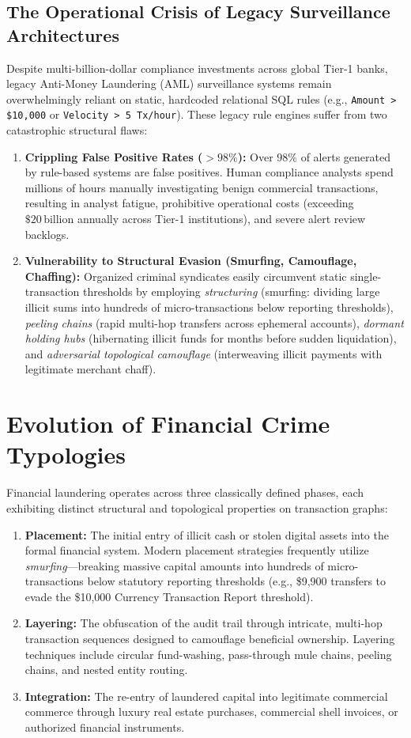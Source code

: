 \subsection{The Operational Crisis of Legacy Surveillance Architectures}
Despite multi-billion-dollar compliance investments across global Tier-1 banks, legacy Anti-Money Laundering (AML) surveillance systems remain overwhelmingly reliant on static, hardcoded relational SQL rules (e.g., \texttt{Amount > \$10,000} or \texttt{Velocity > 5 Tx/hour}). These legacy rule engines suffer from two catastrophic structural flaws:
\begin{enumerate}
    \item \textbf{Crippling False Positive Rates ($>98\%$):} Over $98\%$ of alerts generated by rule-based systems are false positives. Human compliance analysts spend millions of hours manually investigating benign commercial transactions, resulting in analyst fatigue, prohibitive operational costs (exceeding $\$20\,\text{billion}$ annually across Tier-1 institutions), and severe alert review backlogs.
    \item \textbf{Vulnerability to Structural Evasion (Smurfing, Camouflage, Chaffing):} Organized criminal syndicates easily circumvent static single-transaction thresholds by employing \textit{structuring} (smurfing: dividing large illicit sums into hundreds of micro-transactions below reporting thresholds), \textit{peeling chains} (rapid multi-hop transfers across ephemeral accounts), \textit{dormant holding hubs} (hibernating illicit funds for months before sudden liquidation), and \textit{adversarial topological camouflage} (interweaving illicit payments with legitimate merchant chaff).
\end{enumerate}


\section{Evolution of Financial Crime Typologies}
Financial laundering operates across three classically defined phases, each exhibiting distinct structural and topological properties on transaction graphs:
\begin{enumerate}
    \item \textbf{Placement:} The initial entry of illicit cash or stolen digital assets into the formal financial system. Modern placement strategies frequently utilize \textit{smurfing}—breaking massive capital amounts into hundreds of micro-transactions below statutory reporting thresholds (e.g., \$9,900 transfers to evade the \$10,000 Currency Transaction Report threshold).
    \item \textbf{Layering:} The obfuscation of the audit trail through intricate, multi-hop transaction sequences designed to camouflage beneficial ownership. Layering techniques include circular fund-washing, pass-through mule chains, peeling chains, and nested entity routing.
    \item \textbf{Integration:} The re-entry of laundered capital into legitimate commercial commerce through luxury real estate purchases, commercial shell invoices, or authorized financial instruments.
\end{enumerate}

